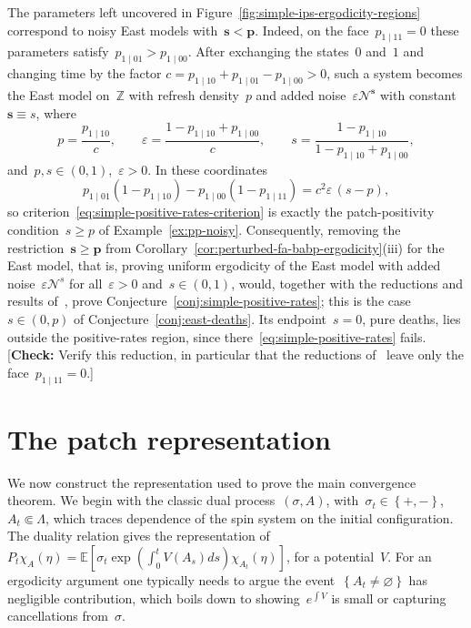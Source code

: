 \documentclass[EJP,preprint,NODS,nobera]{ejpecp}
\newcommand{\Z}{\mathbb{Z}}
\newcommand{\E}{\mathbb{E}}
\newcommand{\bb}[1]{\left(#1\right)}
\newcommand{\Cb}[1]{\left[#1\right]}
\newcommand{\cb}[1]{\left\{#1\right\}}
\newcommand{\vn}{\varnothing}
\newcommand{\mb}[1]{\mathbf{#1}}
\newcommand{\Ncal}{\mathcal{N}}
\newcommand{\authorcheck}[1]{{\color{blue}[\textbf{Check:} #1]}}
\begin{document}
\begin{remark}
\label{rem:simple-remaining-region}
The parameters left uncovered in
Figure~\ref{fig:simple-ips-ergodicity-regions} correspond to noisy East models
with~$\mb s<\mb p$. Indeed, on the face~$p_{1\mid11}=0$ these parameters
satisfy~$p_{1\mid01}>p_{1\mid00}$. After exchanging the states~$0$ and~$1$
and changing time by the factor
$c=p_{1\mid10}+p_{1\mid01}-p_{1\mid00}>0$, such a system becomes the East
model on~$\Z$ with refresh density~$p$ and added noise~$\varepsilon\Ncal^{\mb s}$
with constant~$\mb s\equiv s$, where
\begin{equation*}
p=\frac{p_{1\mid10}}{c},
\qquad
\varepsilon=\frac{1-p_{1\mid10}+p_{1\mid00}}{c},
\qquad
s=\frac{1-p_{1\mid10}}{1-p_{1\mid10}+p_{1\mid00}},
\end{equation*}
and~$p,s\in(0,1)$,~$\varepsilon>0$. In these coordinates
\begin{equation*}
p_{1\mid01}\bb{1-p_{1\mid10}}-p_{1\mid00}\bb{1-p_{1\mid11}}
=
c^2\varepsilon\,(s-p),
\end{equation*}
so criterion~\eqref{eq:simple-positive-rates-criterion} is exactly the
patch-positivity condition~$s\geq p$ of Example~\ref{ex:pp-noisy}. Consequently,
removing the restriction~$\mb s\geq\mb p$ from
Corollary~\ref{cor:perturbed-fa-babp-ergodicity}\textup{(iii)} for the East
model, that is, proving uniform ergodicity of the East model with added
noise~$\varepsilon\Ncal^{s}$ for all~$\varepsilon>0$ and~$s\in(0,1)$, would,
together with the reductions and results
of~\cite{GluchowskiMenz2025,GluchowskiMenz2026}, prove
Conjecture~\ref{conj:simple-positive-rates}; this is the case~$s\in(0,p)$ of
Conjecture~\ref{conj:east-deaths}. Its endpoint~$s=0$, pure deaths, lies
outside the positive-rates region, since there~\eqref{eq:simple-positive-rates}
fails.
\authorcheck{Verify this reduction, in particular that the reductions
of~\cite{GluchowskiMenz2025} leave only the face~$p_{1\mid11}=0$.}
\end{remark}
\section{The patch representation}
\label{sec:probabilistic-interpretation}
\label{subsec:proofs-section-4}

We now construct the representation used to prove the main convergence theorem. We begin with the classic dual process~$\bb{\sigma,A}$, with~$\sigma_t\in\cb{+,-}$,~$A_t\Subset \Lambda$, which traces dependence of the spin system on the initial configuration. 
The duality relation gives the representation of~$P_t\chi_A(\eta) = \E\Cb{\sigma_t \exp\bb{\int_0^t V(A_s)ds}\chi_{A_t}(\eta)}$, for a potential~$V$. For an ergodicity argument one typically needs to argue the event~$\cb{A_t\neq\vn}$ has negligible contribution, which boils down to showing~$e^{\int V}$ is small or capturing cancellations from~$\sigma$.
\end{document}

